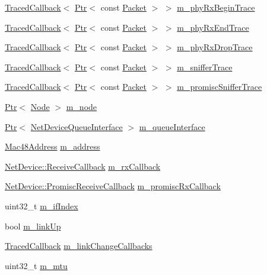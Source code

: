\begin{DoxyCompactItemize}
\item 
\hyperlink{classns3_1_1TracedCallback}{Traced\+Callback}$<$ \hyperlink{classns3_1_1Ptr}{Ptr}$<$ const \hyperlink{classns3_1_1Packet}{Packet} $>$ $>$ \hyperlink{classns3_1_1CsmaNetDevice_abdbb5dd4d62426a5ad0f6cb8cb030b3b}{m\+\_\+phy\+Rx\+Begin\+Trace}
\item 
\hyperlink{classns3_1_1TracedCallback}{Traced\+Callback}$<$ \hyperlink{classns3_1_1Ptr}{Ptr}$<$ const \hyperlink{classns3_1_1Packet}{Packet} $>$ $>$ \hyperlink{classns3_1_1CsmaNetDevice_afe2bac4b10c5d73f78e11668a3e6a679}{m\+\_\+phy\+Rx\+End\+Trace}
\item 
\hyperlink{classns3_1_1TracedCallback}{Traced\+Callback}$<$ \hyperlink{classns3_1_1Ptr}{Ptr}$<$ const \hyperlink{classns3_1_1Packet}{Packet} $>$ $>$ \hyperlink{classns3_1_1CsmaNetDevice_a9413b693a3028dcccb20f653bad58bc0}{m\+\_\+phy\+Rx\+Drop\+Trace}
\item 
\hyperlink{classns3_1_1TracedCallback}{Traced\+Callback}$<$ \hyperlink{classns3_1_1Ptr}{Ptr}$<$ const \hyperlink{classns3_1_1Packet}{Packet} $>$ $>$ \hyperlink{classns3_1_1CsmaNetDevice_a88e5994b762e01f74606742a7f15b797}{m\+\_\+sniffer\+Trace}
\item 
\hyperlink{classns3_1_1TracedCallback}{Traced\+Callback}$<$ \hyperlink{classns3_1_1Ptr}{Ptr}$<$ const \hyperlink{classns3_1_1Packet}{Packet} $>$ $>$ \hyperlink{classns3_1_1CsmaNetDevice_aae7fbd28077e7ac8efee738c4194ed16}{m\+\_\+promisc\+Sniffer\+Trace}
\item 
\hyperlink{classns3_1_1Ptr}{Ptr}$<$ \hyperlink{classns3_1_1Node}{Node} $>$ \hyperlink{classns3_1_1CsmaNetDevice_a9dbd678469e1b1efe74a45b868ead509}{m\+\_\+node}
\item 
\hyperlink{classns3_1_1Ptr}{Ptr}$<$ \hyperlink{classns3_1_1NetDeviceQueueInterface}{Net\+Device\+Queue\+Interface} $>$ \hyperlink{classns3_1_1CsmaNetDevice_a93a7be08d44dbabfdf111e90feb7c72a}{m\+\_\+queue\+Interface}
\item 
\hyperlink{classns3_1_1Mac48Address}{Mac48\+Address} \hyperlink{classns3_1_1CsmaNetDevice_ae26602a3eb4e97c0aa39ae61b4d028f8}{m\+\_\+address}
\item 
\hyperlink{classns3_1_1NetDevice_ad5e5e1ca187472bc2ba99575d8def568}{Net\+Device\+::\+Receive\+Callback} \hyperlink{classns3_1_1CsmaNetDevice_a18646390c167ad8f0f8b8795a9052031}{m\+\_\+rx\+Callback}
\item 
\hyperlink{classns3_1_1NetDevice_a427225795919f26c414bee2ea3f31ed2}{Net\+Device\+::\+Promisc\+Receive\+Callback} \hyperlink{classns3_1_1CsmaNetDevice_a4c9c0533341d76fe278fbef18525b228}{m\+\_\+promisc\+Rx\+Callback}
\item 
uint32\+\_\+t \hyperlink{classns3_1_1CsmaNetDevice_af2bb0a9e64ae4ee179256f480e4eed4e}{m\+\_\+if\+Index}
\item 
bool \hyperlink{classns3_1_1CsmaNetDevice_afc0b0c430b9ee8e8ddde196c340b5764}{m\+\_\+link\+Up}
\item 
\hyperlink{classns3_1_1TracedCallback}{Traced\+Callback} \hyperlink{classns3_1_1CsmaNetDevice_a67dd7e65384a1b9f89dfacc1ede41d69}{m\+\_\+link\+Change\+Callbacks}
\item 
uint32\+\_\+t \hyperlink{classns3_1_1CsmaNetDevice_a4b2e70ee2ee42f63f3756728ec592bc1}{m\+\_\+mtu}
\end{DoxyCompactItemize}
